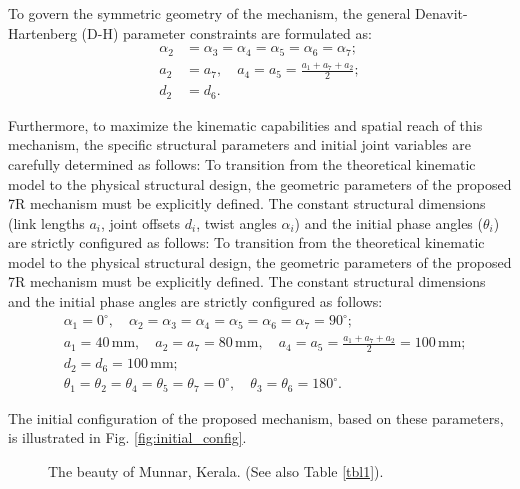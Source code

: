 \documentclass[a4paper,fleqn]{cas-sc}
\begin{document}
To govern the symmetric geometry of the mechanism, the general Denavit-Hartenberg (D-H) parameter constraints are formulated as:
\begin{equation}
    \begin{aligned}
        \alpha_2 &= \alpha_3 = \alpha_4 = \alpha_5 = \alpha_6 = \alpha_7; \\
        a_2 &= a_7, \quad a_4 = a_5 = \frac{a_1 + a_7 + a_2}{2}; \\
        d_2 &= d_6.
    \end{aligned}
\end{equation}

Furthermore, to maximize the kinematic capabilities and spatial reach of this mechanism, the specific structural parameters and initial joint variables are carefully determined as follows:
To transition from the theoretical kinematic model to the physical structural design, the geometric parameters of the proposed 7R mechanism must be explicitly defined. The constant structural dimensions (link lengths $a_i$, joint offsets $d_i$, twist angles $\alpha_i$) and the initial phase angles ($\theta_i$) are strictly configured as follows:
To transition from the theoretical kinematic model to the physical structural design, the geometric parameters of the proposed 7R mechanism must be explicitly defined. The constant structural dimensions and the initial phase angles are strictly configured as follows:
\begin{equation}
    \begin{aligned}
        & \alpha_1 = 0^\circ, \quad \alpha_2 = \alpha_3 = \alpha_4 = \alpha_5 = \alpha_6 = \alpha_7 = 90^\circ; \\
        & a_1 = 40 \, \text{mm}, \quad a_2 = a_7 = 80 \, \text{mm}, \quad a_4 = a_5 = \frac{a_1 + a_7 + a_2}{2} = 100 \, \text{mm}; \\
        & d_2 = d_6 = 100 \, \text{mm}; \\
        & \theta_1 = \theta_2 = \theta_4 = \theta_5 = \theta_7 = 0^\circ, \quad \theta_3 = \theta_6 = 180^\circ.
    \end{aligned}
\end{equation}

The initial configuration of the proposed mechanism, based on these parameters, is illustrated in Fig. \ref{fig:initial_config}.
\begin{figure}
	\centering %
	\caption{The beauty of Munnar, Kerala. (See also Table \protect\ref{tbl1}).} %
	\label{FIG:1} %
\end{figure}
\end{document}
